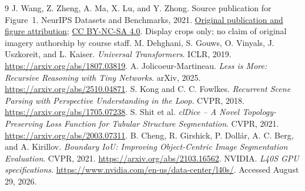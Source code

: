 \documentclass[11pt,letterpaper]{article}
\begin{document}
\begingroup\small
\setlength{\parskip}{2pt}
\begin{thebibliography}{9}
 J. Wang, Z. Zheng, A. Ma, X. Lu, and Y. Zhong. Source publication for Figure~1. NeurIPS Datasets and Benchmarks, 2021. \href{https://arxiv.org/abs/2110.08733}{Original publication and figure attribution}; \href{https://creativecommons.org/licenses/by-nc-sa/4.0/}{CC BY-NC-SA 4.0}. Display crops only; no claim of original imagery authorship by course staff.
 M. Dehghani, S. Gouws, O. Vinyals, J. Uszkoreit, and L. Kaiser. \emph{Universal Transformers}. ICLR, 2019. \url{https://arxiv.org/abs/1807.03819}.
 A. Jolicoeur-Martineau. \emph{Less is More: Recursive Reasoning with Tiny Networks}. arXiv, 2025. \url{https://arxiv.org/abs/2510.04871}.
 S. Kong and C. C. Fowlkes. \emph{Recurrent Scene Parsing with Perspective Understanding in the Loop}. CVPR, 2018. \url{https://arxiv.org/abs/1705.07238}.
 S. Shit et al. \emph{clDice -- A Novel Topology-Preserving Loss Function for Tubular Structure Segmentation}. CVPR, 2021. \url{https://arxiv.org/abs/2003.07311}.
 B. Cheng, R. Girshick, P. Doll\'ar, A. C. Berg, and A. Kirillov. \emph{Boundary IoU: Improving Object-Centric Image Segmentation Evaluation}. CVPR, 2021. \url{https://arxiv.org/abs/2103.16562}.
 NVIDIA. \emph{L40S GPU specifications}. \url{https://www.nvidia.com/en-us/data-center/l40s/}. Accessed August 29, 2026.
\end{thebibliography}
\endgroup
\end{document}
